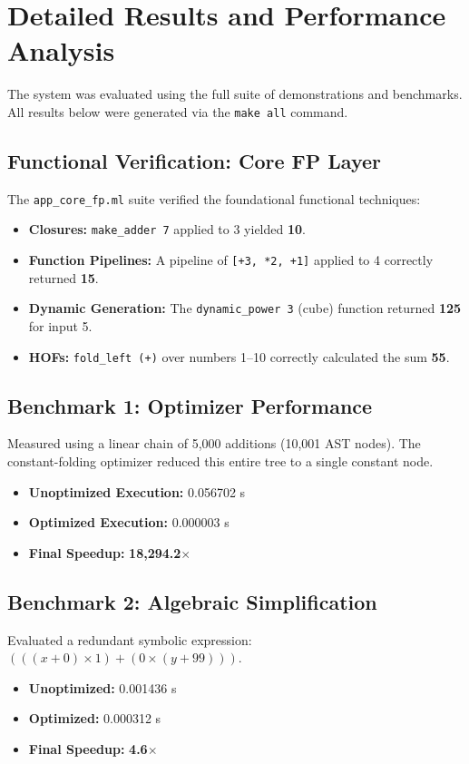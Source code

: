 \documentclass[12pt]{article}
\begin{document}
\section{Detailed Results and Performance Analysis}

The system was evaluated using the full suite of demonstrations and benchmarks. All results below were generated via the \texttt{make all} command.

\subsection{Functional Verification: Core FP Layer}
The \texttt{app\_core\_fp.ml} suite verified the foundational functional techniques:
\begin{itemize}
    \item \textbf{Closures:} \texttt{make\_adder 7} applied to 3 yielded \textbf{10}.
    \item \textbf{Function Pipelines:} A pipeline of \texttt{[+3, *2, +1]} applied to 4 correctly returned \textbf{15}.
    \item \textbf{Dynamic Generation:} The \texttt{dynamic\_power 3} (cube) function returned \textbf{125} for input 5.
    \item \textbf{HOFs:} \texttt{fold\_left (+)} over numbers 1--10 correctly calculated the sum \textbf{55}.
\end{itemize}

\subsection{Benchmark 1: Optimizer Performance}
Measured using a linear chain of 5,000 additions (10,001 AST nodes). The constant-folding optimizer reduced this entire tree to a single constant node.
\begin{itemize}
    \item \textbf{Unoptimized Execution:} 0.056702 s
    \item \textbf{Optimized Execution:} 0.000003 s
    \item \textbf{Final Speedup:} \textbf{18,294.2$\times$}
\end{itemize}

\subsection{Benchmark 2: Algebraic Simplification}
Evaluated a redundant symbolic expression: $(((x + 0) \times 1) + (0 \times (y + 99)))$.
\begin{itemize}
    \item \textbf{Unoptimized:} 0.001436 s
    \item \textbf{Optimized:} 0.000312 s
    \item \textbf{Final Speedup:} \textbf{4.6$\times$}
\end{itemize}
\end{document}
